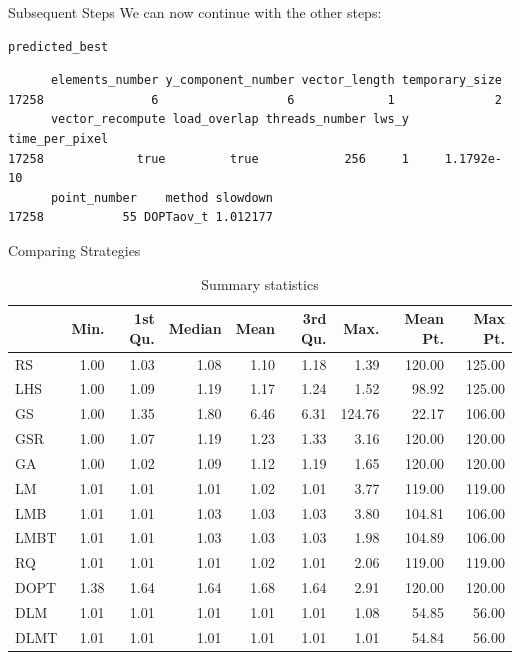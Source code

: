 \documentclass[10pt, compress, aspectratio=169, xcolor={table,usenames,dvipsnames}]{beamer}
\begin{document}
\begin{frame}[fragile,label={sec:orgc141fc0}]{Subsequent Steps}
 We can now \alert{continue} with the \alert{other steps}:
\scriptsize
\lstset{language=r,label= ,caption= ,captionpos=b,numbers=none}
\begin{lstlisting}
predicted_best
\end{lstlisting}

\begin{verbatim}
      elements_number y_component_number vector_length temporary_size
17258               6                  6             1              2
      vector_recompute load_overlap threads_number lws_y time_per_pixel
17258             true         true            256     1     1.1792e-10
      point_number    method slowdown
17258           55 DOPTaov_t 1.012177
\end{verbatim}

\normalsize
\end{frame}

\begin{frame}[label={sec:orga4d49c7}]{Comparing Strategies}
\vspace{0.3cm}

\begin{table}[ht]
\centering
\begingroup\small
\begin{tabular}{lrrrrrrrr}
  \hline
 & Min. & 1st Qu. & Median & Mean & 3rd Qu. & Max. & Mean Pt. & Max Pt. \\
  \hline
RS & 1.00 & 1.03 & 1.08 & 1.10 & 1.18 & 1.39 & 120.00 & 125.00 \\
  LHS & 1.00 & 1.09 & 1.19 & 1.17 & 1.24 & 1.52 & 98.92 & 125.00 \\
  GS & 1.00 & 1.35 & 1.80 & 6.46 & 6.31 & 124.76 & 22.17 & 106.00 \\
  GSR & 1.00 & 1.07 & 1.19 & 1.23 & 1.33 & 3.16 & 120.00 & 120.00 \\
  GA & 1.00 & 1.02 & 1.09 & 1.12 & 1.19 & 1.65 & 120.00 & 120.00 \\
  LM & 1.01 & 1.01 & 1.01 & 1.02 & 1.01 & 3.77 & 119.00 & 119.00 \\
  LMB & 1.01 & 1.01 & 1.03 & 1.03 & 1.03 & 3.80 & 104.81 & 106.00 \\
  LMBT & 1.01 & 1.01 & 1.03 & 1.03 & 1.03 & 1.98 & 104.89 & 106.00 \\
  RQ & 1.01 & 1.01 & 1.01 & 1.02 & 1.01 & 2.06 & 119.00 & 119.00 \\
  DOPT & 1.38 & 1.64 & 1.64 & 1.68 & 1.64 & 2.91 & 120.00 & 120.00 \\
  DLM & 1.01 & 1.01 & 1.01 & 1.01 & 1.01 & 1.08 & 54.85 & 56.00 \\
  DLMT & 1.01 & 1.01 & 1.01 & 1.01 & 1.01 & 1.01 & 54.84 & 56.00 \\
   \hline
\end{tabular}
\endgroup
\caption{Summary statistics}
\end{table}
\end{frame}
\end{document}
